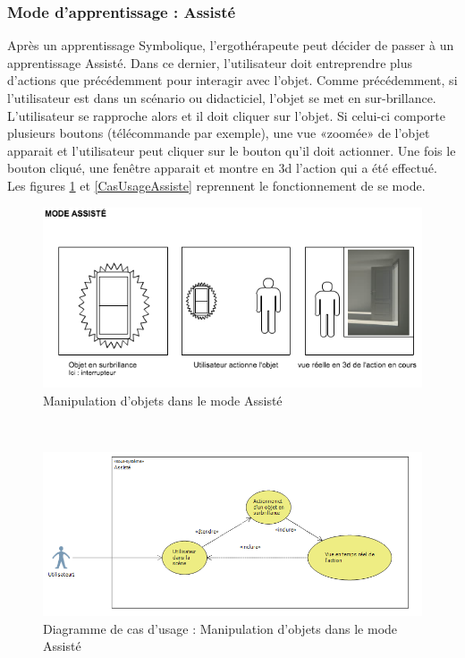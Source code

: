 \subsubsection{Mode d'apprentissage : Assisté}

Après un apprentissage Symbolique, l'ergothérapeute peut décider de passer à un apprentissage Assisté. Dans ce dernier, l'utilisateur doit entreprendre plus d'actions que précédemment pour interagir avec l'objet. Comme précédemment, si l'utilisateur est dans un scénario ou didacticiel, l'objet se met en sur-brillance. L'utilisateur se rapproche alors et il doit cliquer sur l'objet. Si celui-ci comporte plusieurs boutons (télécommande par exemple), une vue «zoomée» de l'objet apparait et l'utilisateur peut cliquer sur le bouton qu'il doit actionner. Une fois le bouton cliqué, une fenêtre apparait et montre en 3d l'action qui a été effectué. 
\\
Les figures \ref{fig:MaquetteAssiste} et \ref{CasUsageAssiste} reprennent le fonctionnement de se mode.

\begin{figure}[h]
\centering
\includegraphics[width=1\textwidth]{img-utilisateur/assiste.png}
\caption{\label{fig:MaquetteAssiste} Manipulation d'objets dans le mode Assisté }
\end{figure}
\\
\begin{figure}[h]
\centering
\includegraphics[width=1\textwidth]{img-utilisateur/cas-usage-assiste.png}
\caption{\label{fig:CasUsageAssiste} Diagramme de cas d'usage : Manipulation d'objets dans le mode Assisté }
\end{figure}
\FloatBarrier 


